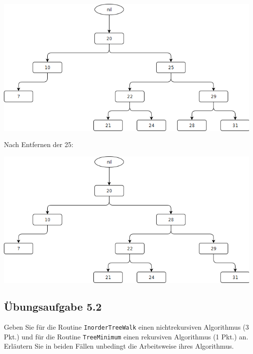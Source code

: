 \documentclass{article}
\begin{document}
\begin{center}
	\includegraphics[scale=0.5]{w5-ressourcen/5-1-2-2.png}
\end{center}
Nach Entfernen der 25:\\
\begin{center}
	\includegraphics[scale=0.5]{w5-ressourcen/5-1-2-3.png}
\end{center}

\subsection*{Übungsaufgabe 5.2}
\label{ssec:5.2}
\begin{flushright}
\begin{Large}
[~~~~\string| ~~4~]
\end{Large}
\end{flushright}
Geben Sie für die Routine \texttt{InorderTreeWalk} einen nichtrekursiven Algorithmus (3 Pkt.) und für die Routine \texttt{TreeMinimum} einen rekursiven Algorithmus (1 Pkt.) an.
Erläutern Sie in beiden Fällen unbedingt die Arbeitsweise ihres Algorithmus.
\end{document}
